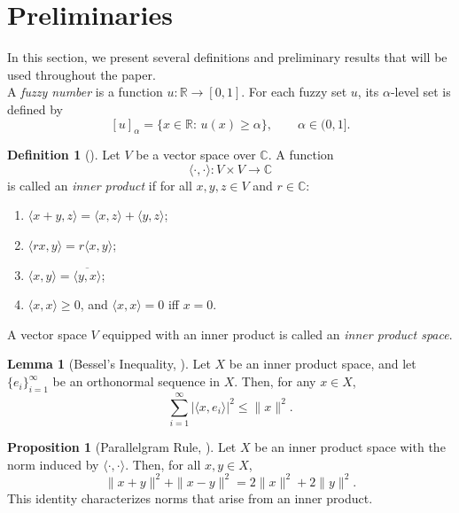 \documentclass[preprint,12pt]{elsarticle}
\theoremstyle{definition}
\newtheorem{definition}{Definition}[section]
\newtheorem{lemma}{Lemma}[section]
\newtheorem{proposition}{Proposition}[section]
\begin{document}
	
	
\section{Preliminaries}
In this section, we present several definitions and preliminary results that will be used throughout the paper.\\
A \textit{fuzzy number} is a function $u:\mathbb{R}\to[0,1]$. For each fuzzy set $u$, its $\alpha$-level set is defined by
\[
[u]_{\alpha}=\{x\in\mathbb{R}:\, u(x)\ge \alpha\}, \qquad \alpha\in(0,1].
\]
\begin{definition}[\citealp{RynneYoungson2008}]\label{def:inner-product}
	Let $V$ be a vector space over $\mathbb{C}$. A function
	\[
	\langle \cdot , \cdot \rangle : V \times V \to \mathbb{C}
	\]
	is called an \emph{inner product} if for all $x,y,z\in V$ and $r\in\mathbb{C}$:
	\begin{enumerate}[label=(\roman*)]
		\item $\langle x+y,z\rangle = \langle x,z\rangle + \langle y,z\rangle$;
		\item $\langle rx,y\rangle = r \langle x,y\rangle$;
		\item $\langle x,y\rangle = \overline{\langle y,x\rangle}$; %
		\item $\langle x,x\rangle \ge 0$, and $\langle x,x\rangle=0$ iff $x=0$.
	\end{enumerate}
	A vector space $V$ equipped with an inner product is called an \emph{inner product space}.
\end{definition}


\begin{lemma}[Bessel's Inequality, \cite{RynneYoungson2008}]
	Let $X$ be an inner product space, and let $\{e_i\}^\infty_{i=1}$ be an orthonormal sequence in $X$. Then, for any $x\in X$,
	\begin{equation}\label{ineq:Bessel's Inequality}
	\sum_{i=1}^{\infty} |\langle x,e_i\rangle|^2\le \|x\|^{2}.		
	\end{equation}
\end{lemma}

\begin{proposition}[Parallelgram Rule,  \cite{RynneYoungson2008}]\label{prop:Parallelgram Rule}
	Let $X$ be an inner product space with the norm induced by $\langle\cdot,\cdot\rangle$. Then, for all $x,y\in X$,
	\[
	\|x+y\|^2+\|x-y\|^2 = 2\|x\|^2 + 2\|y\|^2.
	\]
	This identity characterizes norms that arise from an inner product.
\end{proposition}
\end{document}
